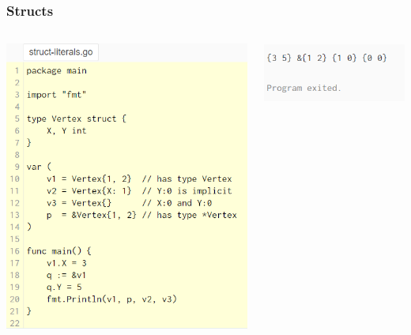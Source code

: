 \documentclass[14pt]{beamer}
\begin{document}
{
\begin{frame}
    \frametitle{Structs}
    \begin{columns}
        \begin{column}{0.6\textwidth}
        \includegraphics[width=0.9\linewidth]{img/struct.PNG}
        \end{column}
        \begin{column}{0.4\textwidth}
        \includegraphics[width=\linewidth]{img/structoutput.PNG}
        \end{column}
    \end{columns}
\end{frame}
}
\end{document}
